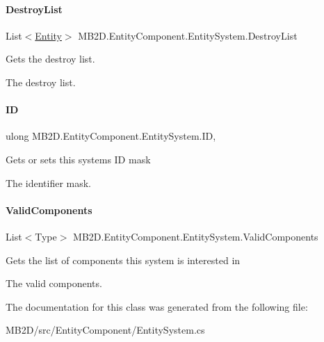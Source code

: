\paragraph{\texorpdfstring{Destroy\+List}{DestroyList}}
{\footnotesize\ttfamily List$<$\hyperlink{class_m_b2_d_1_1_entity_component_1_1_entity}{Entity}$>$ M\+B2\+D.\+Entity\+Component.\+Entity\+System.\+Destroy\+List\hspace{0.3cm}{\ttfamily [get]}}



Gets the destroy list. 

The destroy list.\hypertarget{class_m_b2_d_1_1_entity_component_1_1_entity_system_a33c31c8fda2901b2bebd71caf39c0d23}{}\label{class_m_b2_d_1_1_entity_component_1_1_entity_system_a33c31c8fda2901b2bebd71caf39c0d23} 
\paragraph{\texorpdfstring{ID}{ID}}
{\footnotesize\ttfamily ulong M\+B2\+D.\+Entity\+Component.\+Entity\+System.\+ID\hspace{0.3cm}{\ttfamily [get]}, {\ttfamily [set]}}



Gets or sets this systems ID mask 

The identifier mask.\hypertarget{class_m_b2_d_1_1_entity_component_1_1_entity_system_ad78a75cc9b9bd5a4250ea725dbde3300}{}\label{class_m_b2_d_1_1_entity_component_1_1_entity_system_ad78a75cc9b9bd5a4250ea725dbde3300} 
\paragraph{\texorpdfstring{Valid\+Components}{ValidComponents}}
{\footnotesize\ttfamily List$<$Type$>$ M\+B2\+D.\+Entity\+Component.\+Entity\+System.\+Valid\+Components\hspace{0.3cm}{\ttfamily [get]}}



Gets the list of components this system is interested in 

The valid components.

The documentation for this class was generated from the following file\+:\begin{DoxyCompactItemize}
\item 
M\+B2\+D/src/\+Entity\+Component/Entity\+System.\+cs\end{DoxyCompactItemize}
